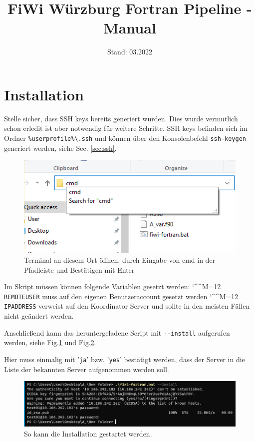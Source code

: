 \documentclass[11pt, a4paper]{article}
\title{\vspace{-3cm}FiWi Würzburg Fortran Pipeline - Manual}
\date{Stand: 03.2022}
\newcommand{\bs}{\textbackslash}
\def\e{\begingroup\catcode`\^^M=12 \xmymacro}
{\catcode`\^^M=12 %
 \gdef\xmymacro#1^^M{\begin{itemize}\item #1\end{itemize}\endgroup}%
}
\begin{document}
\maketitle

\bigskip\noindent


\vspace{-1cm}
\section{Installation}


Stelle sicher, dass SSH keys bereits generiert wurden. Dies wurde vermutlich schon erledit ist aber notwendig für weitere Schritte.
SSH keys befinden sich im Ordner \texttt{\%userprofile\%\bs.ssh} und können über den Konsolenbefehl \texttt{ssh-keygen} generiert werden, siehe Sec. \ref{sec:ssh}.

\begin{figure}
    \centering
    \includegraphics[width=0.85\linewidth]{./pics/2022-03-16_15-36.png}
    \caption{Terminal an diesem Ort öffnen, durch Eingabe von cmd in der Pfadleiste und Bestätigen mit Enter}
    \vspace{-4em}
    \label{fig:install-1}
\end{figure}

Im Skript müssen können folgende Variablen gesetzt werden:
\e \texttt{REMOTEUSER} muss auf den eigenen Benutzeraccount gesetzt werden
\e \texttt{IPADDRESS} verweist auf den Koordinator Server und sollte in den meisten Fällen nicht geändert werden.

Anschließend kann das heruntergeladene Script mit \texttt{-{}-install} aufgerufen werden, siehe Fig.\ref{fig:install-1} und Fig.\ref{fig:install-2}.

Hier muss einmalig mit '\texttt{ja}' bzw. '\texttt{yes}' bestätigt werden, dass der Server in die Liste der bekannten Server aufgenommen werden soll.

\begin{figure}[h]
    \centering
    \includegraphics[width=1\linewidth]{./pics/2022-03-08_23-57.png}
    \caption{So kann die Installation gestartet werden.}
    \label{fig:install-2}
\end{figure}
\end{document}
